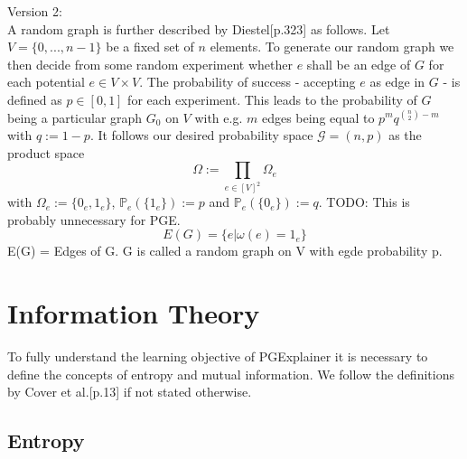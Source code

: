 Version 2: \\
A random graph is further described by Diestel\cite{Diestel2017}[p.323] as follows. Let $V = \{0,...,n-1\}$ be a fixed set of $n$ elements. To generate our random graph we then decide from some random experiment whether $e$ shall be an edge of $G$ for each potential $e \in V \times V$. The probability of success - accepting $e$ as edge in $G$ - is defined as $p \in [0,1]$ for each experiment. This leads to the probability of $G$ being a particular graph $G_0$ on $V$ with e.g. $m$ edges being equal to $p^m q^{\binom{n}{2}-m}$ with $q:=1-p$. It follows our desired probability space $\mathcal{G}=(n,p)$ as the product space
\begin{equation}
    \Omega := \prod_{e \in [V]^2} \Omega_e
\end{equation}
with $\Omega_e := \{0_e,1_e\}$, $\mathbb{P}_e(\{1_e\}) := p$ and $\mathbb{P}_e(\{0_e\}) := q$.
TODO: This is probably unnecessary for PGE.
\begin{equation}
    E(G) = \{e | \omega(e) = 1_e\}
\end{equation}
E(G) = Edges of G. G is called a random graph on V with egde probability p. \bigskip


\section{Information Theory}
To fully understand the learning objective of PGExplainer it is necessary to define the concepts of entropy and mutual information. We follow the definitions by Cover et al.\cite{Cover2005}[p.13] if not stated otherwise.

\subsection{Entropy}


